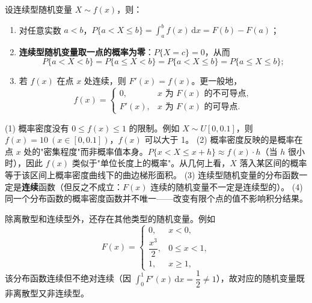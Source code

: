 ﻿\documentclass[lang=cn,11pt]{elegantbook}
\begin{document}
\begin{property}\label{prop:continuous-rv-calc}
设连续型随机变量 $X \sim f(x)$，则：
\begin{enumerate}
    \item 对任意实数 $a < b$，$\displaystyle P\{a < X \le b\} = \int_a^b f(x)\,\mathrm{d}x = F(b) - F(a)$；
    \item \textbf{连续型随机变量取一点的概率为零}：$P\{X = c\} = 0$，从而
    \[
    P\{a < X < b\} = P\{a \le X < b\} = P\{a < X \le b\} = P\{a \le X \le b\};
    \]
    \item 若 $f(x)$ 在点 $x$ 处连续，则 $F'(x) = f(x)$。更一般地，
    \[
    f(x) = \begin{cases}
    0, & x \text{ 为 } F(x) \text{ 的不可导点}, \\
    F'(x), & x \text{ 为 } F(x) \text{ 的可导点}.
    \end{cases}
    \]
\end{enumerate}
\end{property}

\begin{remark}
(1) 概率密度没有 $0 \le f(x) \le 1$ 的限制。例如 $X \sim U[0, 0.1]$，则 $f(x) = 10\ (x \in [0, 0.1])$，$f(x)$ 可以大于 1。\newline
(2) 概率密度反映的是概率在点 $x$ 处的"密集程度"而非概率值本身。$P\{x < X \le x+h\} \approx f(x) \cdot h$（当 $h$ 很小时），因此 $f(x)$ 类似于"单位长度上的概率"。从几何上看，$X$ 落入某区间的概率等于该区间上概率密度曲线下的曲边梯形面积。\newline
(3) 连续型随机变量的分布函数一定是\textbf{连续}函数（但反之不成立：$F(x)$ 连续的随机变量不一定是连续型的）。\newline
(4) 同一个分布函数的概率密度函数并不唯一——改变有限个点的值不影响积分结果。
\end{remark}

\begin{note}
除离散型和连续型外，还存在其他类型的随机变量。例如
\[
F(x) = \begin{cases}
0, & x < 0, \\
\dfrac{x^3}{2}, & 0 \le x < 1, \\
1, & x \ge 1,
\end{cases}
\]
该分布函数连续但不绝对连续（因 $\int_0^1 F'(x)\,\mathrm{d}x = \dfrac{1}{2} \neq 1$），故对应的随机变量既非离散型又非连续型。
\end{note}
\end{document}
